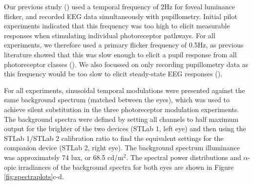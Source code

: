 \documentclass[
]{article}
\begin{document}
Our previous study () used a temporal frequency of 2Hz for foveal luminance flicker, and recorded EEG data simultaneously with pupillometry. Initial pilot experiments indicated that this frequency was too high to elicit measurable responses when stimulating individual photoreceptor pathways. For all experiments, we therefore used a primary flicker frequency of 0.5Hz, as previous literature showed that this was slow enough to elicit a pupil response from all photoreceptor classes (). We also focussed on only recording pupillometry data as this frequency would be too slow to elicit steady-state EEG responses ().

For all experiments, sinusoidal temporal modulations were presented against the same background spectrum (matched between the eyes), which was used to achieve silent substitution in the three photoreceptor modulation experiments. The background spectra were defined by setting all channels to half maximum output for the brighter of the two devices (STLab 1, left eye) and then using the STLab 1/STLab 2 calibration ratio to find the equivalent settings for the companion device (STLab 2, right eye). The background spectrum illuminance was approximately 74 lux, or 68.5 cd/m\(^2\). The spectral power distributions and \(\alpha\)-opic irradiances of the background spectra for both eyes are shown in Figure \ref{fig:spectraplots}c-d.
\end{document}
